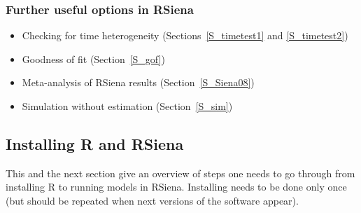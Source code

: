 \documentclass[a4paper,fleqn,11pt]{article}
\newcommand{\+}{\, + \,}
\newcommand{\R}{{\sf R }}
\newcommand{\rs}{{\sf RSiena}}
\newcommand{\RS}{{\sf \textsf{RSiena} }}
\begin{document}
\subsubsection{Further useful options in \RS}
\label{S_etc}
\begin{itemize}
	\item	Checking for time heterogeneity (Sections~\ref{S_timetest1}
            and \ref{S_timetest2})
	\item	Goodness of fit (Section~\ref{S_gof})
	\item	Meta-analysis of \RS results (Section~\ref{S_Siena08})
	\item	Simulation without estimation (Section~\ref{S_sim})
\end{itemize}

\subsection{Installing \R and \RS }
\label{S_use}
\noindent
This and the next section give an overview of steps one needs to go through from
installing \R to running models in \rs.
Installing needs to be done only once (but should be repeated when next versions
of the software appear).
\end{document}
